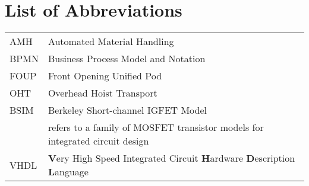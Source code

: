 %
%
%
%

\chapter*{List of Abbreviations}

\begin{tabular}{ll}
AMH		& Automated Material Handling \\
BPMN    & Business Process Model and Notation \\
FOUP    & Front Opening Unified Pod\\
OHT		& Overhead Hoist Transport \\

BSIM		& Berkeley Short-channel IGFET Model \\ 
		& refers to a family of MOSFET transistor models for integrated circuit design \\
VHDL		& \textbf {V}ery High Speed Integrated Circuit \textbf {H}ardware \textbf {D}escription \textbf {L}anguage

\end{tabular}
